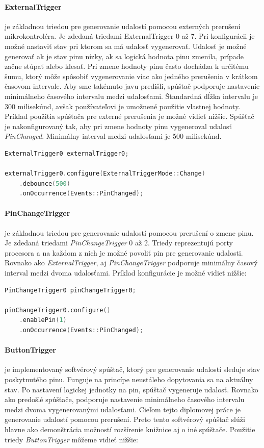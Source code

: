 \paragraph*{ExternalTrigger} \: je základnou triedou pre generovanie udalostí pomocou externých prerušení mikrokontroléra. Je zdedaná triedami ExternalTrigger 0 až 7.
Pri konfigurácii je možné nastaviť stav pri ktorom sa má udalosť vygenerovať. Udalosť je možné generovať ak je stav pinu nízky, ak sa logická hodnota pinu zmenila, prípade
začne stúpať alebo klesať. Pri zmene hodnoty pinu často dochádza k určitému šumu, ktorý môže spôsobiť vygenerovanie viac ako jedného prerušenia v krátkom časovom intervale.
Aby sme takémuto javu predišli, spúštač podporuje nastavenie minimálneho časového intervalu medzi udalosťami.
Štandardná dĺžka intervalu je 300 milisekúnd, avšak používateľovi je umožnené použitie vlastnej hodnoty.
Príklad použitia spúštača pre externé prerušenia je možné vidieť nižšie. Spúšťač je nakonfigurovaný tak, aby pri zmene hodnoty pinu vygeneroval udalosť \textit{PinChanged}.
Minimálny interval medzi udalosťami je 500 milisekúnd.
\begin{lstlisting}[language=c++]      
ExternalTrigger0 externalTrigger0;

externalTrigger0.configure(ExternalTriggerMode::Change)
    .debounce(500)
    .onOccurrence(Events::PinChanged);
\end{lstlisting}

\paragraph*{PinChangeTrigger} \: je základnou triedou pre generovanie udalostí pomocou prerušení o zmene pinu. Je zdedaná triedami \textit{PinChangeTrigger} 0 až 2.
Triedy reprezentujú porty procesora a na každom z nich je možné povoliť pin pre generovanie udalosti. Rovnako ako \textit{ExternalTrigger}, aj \textit{PinChangeTrigger}
podporuje minimálny časový interval medzi dvoma udalosťami. Príklad konfigurácie je možné vidieť nižšie:
\begin{lstlisting}[language=c++]      
PinChangeTrigger0 pinChangeTrigger0;

pinChangeTrigger0.configure()
    .enablePin(1)
    .onOccurrence(Events::PinChanged);
\end{lstlisting}

\paragraph*{ButtonTrigger} \: je implementovaný softvérový spúštač, ktorý pre generovanie udalostí sleduje stav poskytnutého pinu. Funguje na princípe neustáleho
dopytovania sa na aktuálny stav. Po nastavení logickej jednotky na pin, spúštač vygeneruje udalosť. Rovnako ako predošlé spúšťače, podporuje nastavenie minimálneho
časového intervalu medzi dvoma vygenerovanými udalosťami. Cieľom tejto diplomovej práce je generovanie udalostí pomocou prerušení. Preto tento softvérový spúštač
slúži hlavne ako demonštrácia možností rozšírenie knižnice aj o iné spúštače.
Použitie triedy \textit{ButtonTrigger} môžeme vidieť nižšie:

